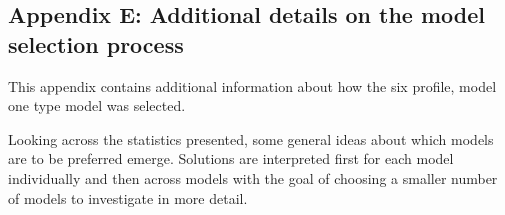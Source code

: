 \documentclass[]{book}
\theoremstyle{definition}
\theoremstyle{definition}
\theoremstyle{definition}
\theoremstyle{remark}
\begin{document}
\subsection{Appendix E: Additional details on the model selection
process}\label{appendix-e-additional-details-on-the-model-selection-process}

This appendix contains additional information about how the six profile,
model one type model was selected.

Looking across the statistics presented, some general ideas about which
models are to be preferred emerge. Solutions are interpreted first for
each model individually and then across models with the goal of choosing
a smaller number of models to investigate in more detail.

\begin{landscape}\begin{table}


\end{table}
\end{landscape}
\end{document}
